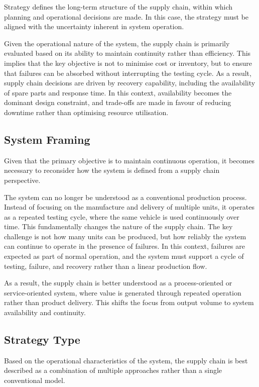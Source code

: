 Strategy defines the long-term structure of the supply chain, within which planning and operational decisions are made. In this case, the strategy must be aligned with the uncertainty inherent in system operation.

Given the operational nature of the system, the supply chain is primarily evaluated based on its ability to maintain continuity rather than efficiency. This implies that the key objective is not to minimise cost or inventory, but to ensure that failures can be absorbed without interrupting the testing cycle. As a result, supply chain decisions are driven by recovery capability, including the availability of spare parts and response time. In this context, availability becomes the dominant design constraint, and trade-offs are made in favour of reducing downtime rather than optimising resource utilisation.

\subsection{System Framing}

Given that the primary objective is to maintain continuous operation, it becomes necessary to reconsider how the system is defined from a supply chain perspective.

The system can no longer be understood as a conventional production process. Instead of focusing on the manufacture and delivery of multiple units, it operates as a repeated testing cycle, where the same vehicle is used continuously over time. This fundamentally changes the nature of the supply chain. The key challenge is not how many units can be produced, but how reliably the system can continue to operate in the presence of failures. In this context, failures are expected as part of normal operation, and the system must support a cycle of testing, failure, and recovery rather than a linear production flow.

As a result, the supply chain is better understood as a process-oriented or service-oriented system, where value is generated through repeated operation rather than product delivery. This shifts the focus from output volume to system availability and continuity.

\subsection{Strategy Type}

Based on the operational characteristics of the system, the supply chain is best described as a combination of multiple approaches rather than a single conventional model.


